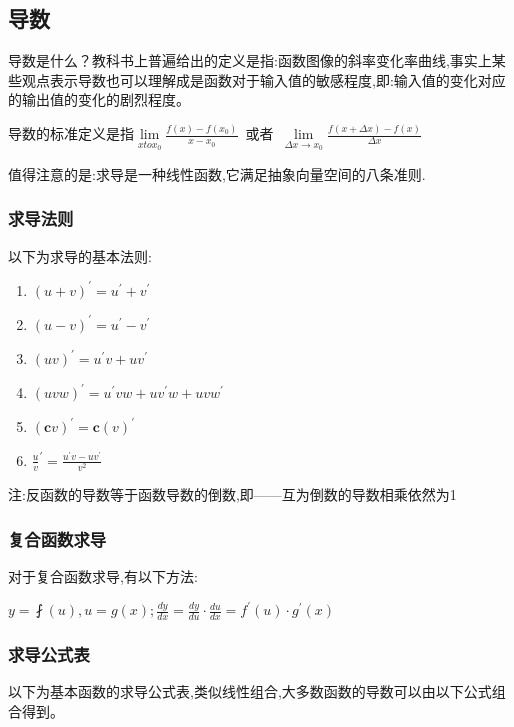 \documentclass[UTF8]{ctexbook}
\newcommand{\limNormal}[1]{\lim\limits_{#1}}
\newcommand{\derivative}{^\prime}
\begin{document}
{{{}%

\subsection{导数}{
  导数是什么？教科书上普遍给出的定义是指:函数图像的斜率变化率曲线,事实上某些观点表示导数也可以理解成是函数对于输入值的敏感程度,即:输入值的变化对应的输出值的变化的剧烈程度。

  导数的标准定义是指$\limNormal{x to x_0}\frac{f(x) - f(x_0)}{x - x_0}$\ 或者\ $\limNormal{\Delta x \to x_0}\frac{f(x + \Delta x) - f(x)}{\Delta x}$

  值得注意的是:求导是一种线性函数,它满足抽象向量空间的八条准则.

  \subsubsection{求导法则}{
    以下为求导的基本法则:
    \begin{enumerate}
      \item $(u + v)\derivative = u\derivative + v\derivative$
      \item $(u - v)\derivative = u\derivative - v\derivative$
      \item $(uv)\derivative = u\derivative v + uv\derivative$
      \item $(uvw)\derivative = u\derivative vw + uv\derivative w + uvw\derivative$
      \item $(\mathbf{c}v)\derivative = \mathbf{c}(v)\derivative$
      \item $\frac{u}{v}\derivative = \frac{u\derivative v - uv\derivative}{v^2}$
    \end{enumerate}
    注:反函数的导数等于函数导数的倒数,即——互为倒数的导数相乘依然为1
  }%

  \subsubsection{复合函数求导}{
    对于复合函数求导,有以下方法:

    $y = \fint(u), u = g(x); \frac{dy}{dx} = \frac{dy}{du} \cdot \frac{du}{dx} = f\derivative(u) \cdot g\derivative(x)$
  }%

  \subsubsection{求导公式表}{
    以下为基本函数的求导公式表,类似线性组合,大多数函数的导数可以由以下公式组合得到。

}}}}
\end{document}
